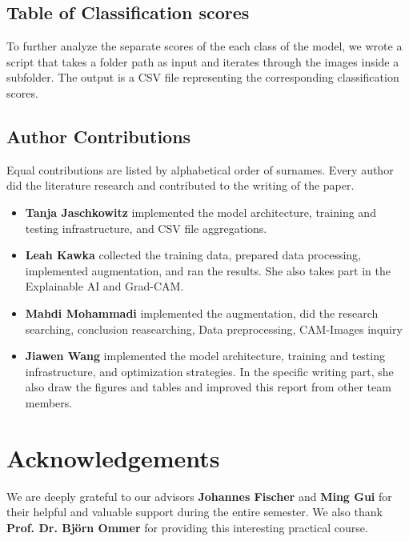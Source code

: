 \subsection{Table of Classification scores}
\label{sec:optim:csv}
To further analyze the separate scores of the each class of the model, 
we wrote a script that takes a folder path as input and iterates through the images inside a subfolder. 
The output is a CSV file representing the corresponding classification scores. 

\subsection*{Author Contributions}
\label{sec:author}
Equal contributions are listed by alphabetical order of surnames. 
Every author did the literature research and contributed to the writing of the paper. 

\begin{itemize}
  \item \textbf{Tanja Jaschkowitz} implemented the model architecture, training and testing infrastructure, and CSV file aggregations. 
  \item \textbf{Leah Kawka} collected the training data, prepared data processing, implemented augmentation, and ran the results. 
  She also takes part in the Explainable AI and Grad-CAM.
  \item \textbf{Mahdi Mohammadi} implemented the augmentation, did the research searching, conclusion reasearching, Data preprocessing, CAM-Images inquiry
  \item \textbf{Jiawen Wang} implemented the model architecture, training and testing infrastructure, and optimization strategies. 
  In the specific writing part, she also draw the figures and tables and improved this report from other team members.
\end{itemize}

\section*{Acknowledgements}

We are deeply grateful to our advisors \textbf{Johannes Fischer} and \textbf{Ming Gui} for their helpful and valuable support during the entire semester. 
We also thank \textbf{Prof. Dr. Björn Ommer} for providing this interesting practical course.

